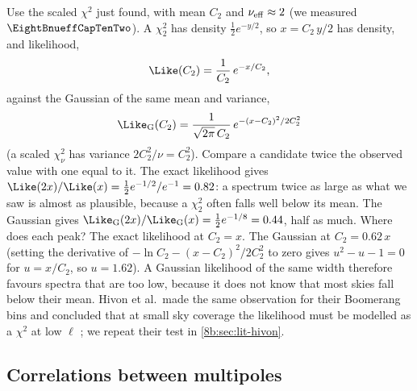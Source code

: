 Use the scaled $\chi^2$ just found, with mean $C_2$ and $\nu_{\rm eff}\approx2$ (we measured $\EightBnueffCapTenTwo$). A $\chi^2_2$
has density $\tfrac12e^{-y/2}$, so $x=C_2\,y/2$ has density, and likelihood,
\[
  \Like(C_2)=\frac1{C_2}\,e^{-x/C_2},
\]
against the Gaussian of the same mean and variance,
\[
  \Like_{\rm G}(C_2)=\frac1{\sqrt{2\pi}\,C_2}\,e^{-(x-C_2)^2/2C_2^2}
\]
(a scaled $\chi^2_\nu$ has variance $2C_2^2/\nu=C_2^2$). Compare a candidate twice the observed value with
one equal to it. The exact likelihood gives $\Like(2x)/\Like(x)=\tfrac12e^{-1/2}/e^{-1}=0.82$: a spectrum twice
as large as what we saw is almost as plausible, because a $\chi^2_2$ often falls well below its mean. The
Gaussian gives $\Like_{\rm G}(2x)/\Like_{\rm G}(x)=\tfrac12e^{-1/8}=0.44$, half as much. Where does each peak?
The exact likelihood at $C_2=x$. The Gaussian at $C_2=0.62\,x$ (setting the derivative of
$-\ln C_2-(x-C_2)^2/2C_2^2$ to zero gives $u^2-u-1=0$ for $u=x/C_2$, so $u=1.62$). A Gaussian likelihood of the
same width therefore favours spectra that are too low, because it does not know that most skies fall
below their mean. Hivon et al.\ made the same observation for their Boomerang bins and concluded that at small sky
coverage the likelihood must be modelled as a $\chi^2$ at low $\ell$ ; we repeat their
test in \cref{8b:sec:lit-hivon}.

\subsection{Correlations between multipoles}
\label{8b:sec:corr}

